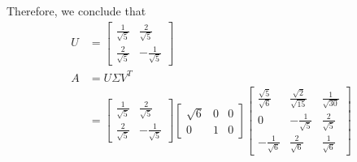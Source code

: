 Therefore, we conclude that
\begin{align*}
U &=
\begin{bmatrix}
\frac{1}{\sqrt{5}} & \frac{2}{\sqrt{5}} \\
\frac{2}{\sqrt{5}} & -\frac{1}{\sqrt{5}}
\end{bmatrix} \\
A &= U\Sigma V^T \\
&= 
\begin{bmatrix}
\frac{1}{\sqrt{5}} & \frac{2}{\sqrt{5}} \\
\frac{2}{\sqrt{5}} & -\frac{1}{\sqrt{5}}
\end{bmatrix}
\begin{bmatrix}
\sqrt{6} & 0 & 0 \\
0 & 1 & 0
\end{bmatrix}
\begin{bmatrix}
\frac{\sqrt{5}}{\sqrt{6}} & \frac{\sqrt{2}}{\sqrt{15}} & \frac{1}{\sqrt{30}} \\
0 & -\frac{1}{\sqrt{5}} & \frac{2}{\sqrt{5}} \\
-\frac{1}{\sqrt{6}} & \frac{2}{\sqrt{6}} & \frac{1}{\sqrt{6}}
\end{bmatrix}
\end{align*}

